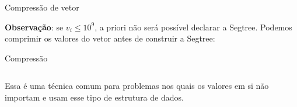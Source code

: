 \begin{frame}{Compressão de vetor}

    {\bf Observação}: se $v_i \leq 10^9$, a priori não será possível declarar a Segtree. Podemos comprimir os valores do vetor antes de construir a Segtree:

    \begin{block}{Compressão}
        \footnotesize
        \inputminted{cpp}{codigos/compressao.cpp}    
    \end{block}

    Essa é uma técnica comum para problemas nos quais os valores em si não importam e usam esse tipo de estrutura de dados.


\end{frame}
